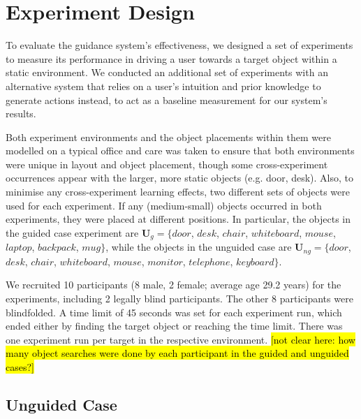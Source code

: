 \documentclass[runningheads]{llncs}
\DeclareRobustCommand{\tofix}[1]{{\sethlcolor{yellow}\hl{[#1]}}}
\begin{document}
\section{Experiment Design}\label{sec:experiments}

To evaluate the guidance system's effectiveness, we designed a set of experiments to measure its performance in driving a user towards a target object within a static environment. 
We conducted an additional set of experiments with an alternative system that relies on a user's intuition and prior knowledge to generate actions instead, to act as a baseline measurement for our system's results. 

Both experiment environments and the object placements within them were modelled on a typical office and care was taken to ensure that both environments were unique in layout and object placement, though some cross-experiment occurrences appear with the larger, more static objects (e.g. door, desk). 
Also, to minimise any cross-experiment learning effects, two different sets of objects were used for each experiment. If any (medium-small) objects occurred in both experiments, they were placed at different positions. 
In particular, the objects in the guided case experiment are $\mathbf{U}_{g} = \{ door$, $desk$, $chair$, $whiteboard$, $mouse$, $laptop$, $backpack$, $mug \}$, while the objects in the unguided case are $\mathbf{U}_{ng} = \{ door$, $desk$, $chair$, $whiteboard$, $mouse$, $monitor$, $telephone$, $keyboard \}$.

We recruited 10 participants (8 male, 2 female; average age 29.2 years) for the experiments, including 2 legally blind participants. 
The other 8 participants were blindfolded. 
A time limit of 45 seconds was set for each experiment run, which ended either by finding the target object or reaching the time limit.
There was one experiment run per target in the respective environment. \tofix{not clear here: how many object searches were done by each participant in the guided and unguided cases?}


\subsection{Unguided Case}

\end{document}
